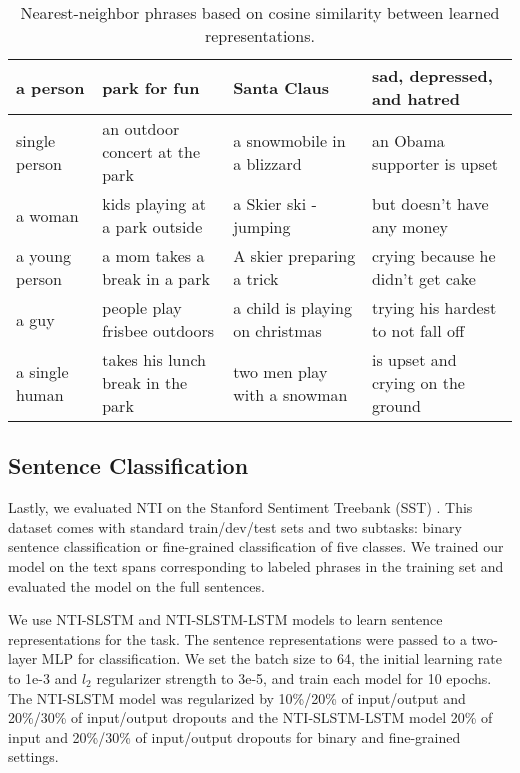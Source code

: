 \documentclass[11pt]{article}
\begin{document}
\begin{table*}[t]
\begin{center}
\hspace*{-0.6cm}
\small
\begin{tabular}{l|l|l|l}
\hline 
\bf a person & \bf park for fun & \bf Santa Claus & \bf sad, depressed, and hatred  \\
\hline
\multicolumn{1}{l|}{single person} & \multicolumn{1}{|l|}{an outdoor concert at the park} & \multicolumn{1}{|l|}{a snowmobile in a blizzard} & \multicolumn{1}{|l}{an Obama supporter is upset} \\
\multicolumn{1}{l|}{a woman} & \multicolumn{1}{|l|}{kids playing at a park outside} & \multicolumn{1}{|l|}{a Skier ski - jumping } & \multicolumn{1}{|l}{but doesn't have any money} \\
\multicolumn{1}{l|}{a young person} & \multicolumn{1}{|l|}{a mom takes a break in a park} & \multicolumn{1}{|l|}{A skier preparing a trick} & \multicolumn{1}{|l}{crying because he didn't get cake} \\
\multicolumn{1}{l|}{a guy} & \multicolumn{1}{|l|}{people play frisbee outdoors} & \multicolumn{1}{|l|}{a child is playing on christmas} & \multicolumn{1}{|l}{trying his hardest to not fall off} \\
\multicolumn{1}{l|}{a single human} & \multicolumn{1}{|l|}{takes his lunch break in the park} & \multicolumn{1}{|l|}{two men play with a snowman} & \multicolumn{1}{|l}{is upset and crying on the ground} \\
\hline
\end{tabular}
\end{center}
\caption{\label{table:phrase}Nearest-neighbor phrases based on cosine similarity between learned representations.}
\end{table*}

\subsection{Sentence Classification}

Lastly, we evaluated NTI on the Stanford Sentiment Treebank (SST) \cite{socher2013recursive}. This dataset comes with standard train/dev/test sets and two subtasks: binary sentence classification or fine-grained classification of five classes. We trained our model on the text spans corresponding to labeled phrases in the training set and evaluated the model on the full sentences.

We use NTI-SLSTM and NTI-SLSTM-LSTM models to learn sentence representations for the task. The sentence representations were passed to a two-layer MLP for classification. 
We set the batch size to 64, the initial learning rate to 1e-3 and $l_2$ regularizer strength to 3e-5, and train each model for 10 epochs. The NTI-SLSTM model was regularized by 10\%/20\% of input/output and 20\%/30\% of input/output dropouts and the NTI-SLSTM-LSTM model 20\% of input and 20\%/30\% of input/output dropouts for binary and fine-grained settings.
\end{document}
